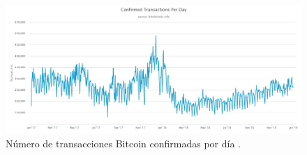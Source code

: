 \begin{figure}
	\centering
	\includegraphics[width=1\textwidth]{imagenes/confirmed-transactions-per-day.jpeg}
	\caption{\label{fig1}Número de transacciones Bitcoin confirmadas por día \cite{blockchaininfo}.}
\end{figure}

